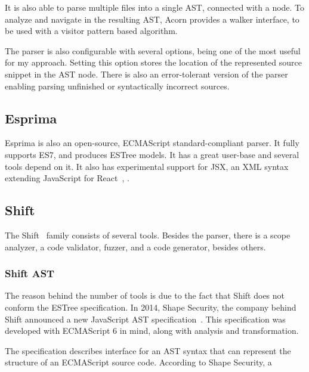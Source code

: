 It is also able to parse multiple files into a single AST, connected with a  node. To analyze and navigate in the resulting AST, Acorn provides a walker interface, to be used with a visitor pattern based algorithm.

The parser is also configurable with several options,  being one of the most useful for my approach. Setting this option stores the location of the represented source snippet in the AST node. There is also an error-tolerant version of the parser enabling parsing unfinished or syntactically incorrect sources.


\subsection{Esprima}
Esprima is also an open-source, ECMAScript standard-compliant parser. It fully supports ES7, and produces ESTree models. It has a great user-base and several tools depend on it. It also has experimental support for JSX, an XML syntax extending JavaScript for React~\cite{react}, .


\subsection{Shift}
\label{sect:shift}
The Shift~\cite{shift} family consists of several tools. Besides the parser, there is a scope analyzer, a code validator, fuzzer, and a code generator, besides others.

\subsubsection{Shift AST}
The reason behind the number of tools is due to the fact that Shift does not conform the ESTree specification. In 2014, Shape Security, the company behind Shift announced a new JavaScript AST specification~\cite{shift-spec}. This specification was developed with ECMAScript 6 in mind, along with analysis and transformation.

The specification describes interface for an AST syntax that can represent the structure of an ECMAScript source code. According to Shape Security, a 

